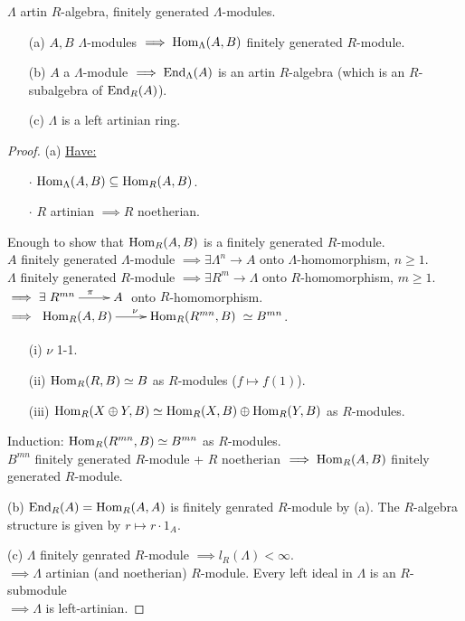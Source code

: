 \begin{prop}\label{prop:44}
$\Lambda$ artin $R$-algebra, finitely generated $\Lambda$-modules.
\begin{enumerate}
\item[(a)] $A,B$ $\Lambda$-modules $\implies  \operatorname{Hom}_\Lambda(A,B)$ finitely generated $R$-module.

\item[(b)] $A$ a $\Lambda$-module $\implies \operatorname{End}_\Lambda(A)$ is an artin $R$-algebra (which is an $R$-subalgebra of $\operatorname{End}_R(A)$).

\item[(c)] $\Lambda$ is a left artinian ring.
\end{enumerate}
\end{prop}
\begin{proof}
(a) \underline{Have:} \begin{enumerate}
\item[$\cdot$] $\operatorname{Hom}_\Lambda(A,B) \subseteq \operatorname{Hom}_R(A,B)$.
\item[$\cdot$] $R$ artinian $\implies R$ noetherian.
\end{enumerate}
Enough to show that $\operatorname{Hom}_R(A,B)$ is a finitely generated $R$-module.\\
$A$ finitely generated $\Lambda$-module $\implies \exists \Lambda^n \to A$ onto $\Lambda$-homomorphism, $n \geq 1$.\\
$\Lambda$ finitely generated $R$-module $\implies \exists R^m \to \Lambda$ onto $R$-homomorphism, $m \geq 1$.\\
$\implies \exists \xymatrix{R^{mn} \ar[r]^\pi & A}$ onto $R$-homomorphism.\\
$\implies \xymatrix{\Hom_R(A,B) \ar[r]^\nu & \Hom_R(R^{mn},B)} \simeq B^{mn}$.\\
\begin{exer}
\begin{enumerate}
\item[(i)] $\nu$ 1-1.
\item[(ii)] $\operatorname{Hom}_R(R,B) \simeq B$ as $R$-modules ($f \mapsto f(1)$).
\item[(iii)] $\operatorname{Hom}_R(X \oplus Y, B) \simeq \operatorname{Hom}_R(X,B) \oplus \operatorname{Hom}_R(Y,B)$ as $R$-modules.
\end{enumerate}
\end{exer}

Induction: $\operatorname{Hom}_R(R^{mn},B) \simeq B^{mn}$ as $R$-modules.\\
$B^{mn}$ finitely generated $R$-module + $R$ noetherian $\implies \operatorname{Hom}_R(A,B)$ finitely generated $R$-module.

(b) $\operatorname{End}_R(A) = \operatorname{Hom}_R(A,A)$ is finitely genrated $R$-module by
(a). The $R$-algebra structure is given by $r \mapsto r\cdot 1_A$. 

(c) $\Lambda$ finitely genrated $R$-module $\implies l_R(\Lambda) < \infty$.\\
$\implies \Lambda$ artinian (and noetherian) $R$-module. Every left ideal in $\Lambda$ is an $R$-submodule\\
$\implies \Lambda$ is left-artinian.
\end{proof}


